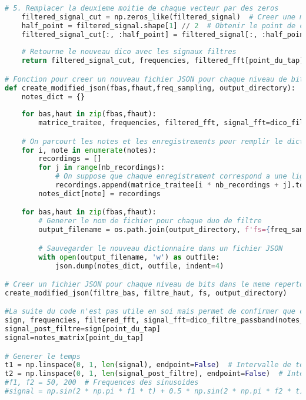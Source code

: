 \documentclass[11pt,letterpaper]{article}
\begin{document}
\begin{lstlisting}[language=python]
    # 5. Remplacer la deuxieme moitie de chaque vecteur par des zeros
    filtered_signal_cut = np.zeros_like(filtered_signal)  # Creer une matrice du meme type, remplie de zeros
    half_point = filtered_signal.shape[1] // 2  # Obtenir le point de coupure (moitie)
    filtered_signal_cut[:, :half_point] = filtered_signal[:, :half_point]
    
    # Retourne le nouveau dico avec les signaux filtres
    return filtered_signal_cut, frequencies, filtered_fft[point_du_tap], signal_fft[point_du_tap]

# Fonction pour creer un nouveau fichier JSON pour chaque niveau de bits
def create_modified_json(fbas,fhaut,freq_sampling, output_directory):
    notes_dict = {}
    
    for bas,haut in zip(fbas,fhaut):
        matrice_traitee, frequencies, filtered_fft, signal_fft=dico_filtre_passband(notes_matrix,bas,haut)

    # On parcourt les notes et les enregistrements pour remplir le dictionnaire
    for i, note in enumerate(notes):
        recordings = []
        for j in range(nb_recordings):
            # On suppose que chaque enregistrement correspond a une ligne dans notes_matrix
            recordings.append(matrice_traitee[i * nb_recordings + j].tolist())  # Convertir en liste
        notes_dict[note] = recordings

    for bas,haut in zip(fbas,fhaut):
        # Generer le nom de fichier pour chaque duo de filtre
        output_filename = os.path.join(output_directory, f'fs={freq_sampling}-fbas={bas}-fhaut={haut}.json')

        # Sauvegarder le nouveau dictionnaire dans un fichier JSON
        with open(output_filename, 'w') as outfile:
            json.dump(notes_dict, outfile, indent=4)

# Creer un fichier JSON pour chaque niveau de bits dans le meme repertoire que le fichier original
create_modified_json(filtre_bas, filtre_haut, fs, output_directory)

#La suite du code n'est pas utile en soi mais permet de confirmer que ca donne la bonne chose
sign, frequencies, filtered_fft, signal_fft=dico_filtre_passband(notes_matrix,filtre_bas[0],filtre_haut[0])
signal_post_filtre=sign[point_du_tap]
signal=notes_matrix[point_du_tap]

# Generer le temps 
t1 = np.linspace(0, 1, len(signal), endpoint=False)  # Intervalle de temps
t2 = np.linspace(0, 1, len(signal_post_filtre), endpoint=False)  # Intervalle de temps
#f1, f2 = 50, 200  # Frequences des sinusoides
#signal = np.sin(2 * np.pi * f1 * t) + 0.5 * np.sin(2 * np.pi * f2 * t)


\end{lstlisting}
\end{document}
